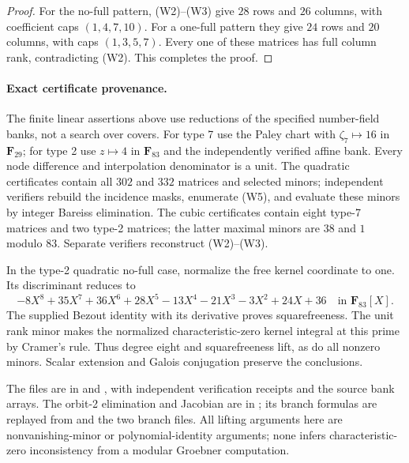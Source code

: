 \begin{proof}
For the no-full pattern, (W2)--(W3) give $28$ rows and $26$ columns,
with coefficient caps $(1,4,7,10)$.  For a one-full pattern they give
$24$ rows and $20$ columns, with caps $(1,3,5,7)$.
Every one of these matrices has full column rank, contradicting (W2).
This completes the proof.
\end{proof}

\paragraph{Exact certificate provenance.}
The finite linear assertions above use reductions of the specified
number-field banks, not a search over covers.  For type 7 use the
Paley chart with $\zeta_7\mapsto16$ in $\mathbf F_{29}$; for type 2
use $z\mapsto4$ in $\mathbf F_{83}$ and the independently verified
affine bank.  Every node difference and interpolation denominator is
a unit.  The quadratic certificates contain all $302$ and $332$
matrices and selected minors; independent verifiers rebuild the
incidence masks, enumerate (W5), and evaluate these minors by integer
Bareiss elimination.  The cubic certificates contain eight type-7
matrices and two type-2 matrices; the latter maximal minors are
$38$ and $1$ modulo $83$.  Separate verifiers reconstruct (W2)--(W3).

In the type-2 quadratic no-full case, normalize the free kernel
coordinate to one.  Its discriminant reduces to
\[
 -8X^8+35X^7+36X^6+28X^5-13X^4-21X^3-3X^2+24X+36
 \quad\text{in }\mathbf F_{83}[X].
\]
The supplied Bezout identity with its derivative proves squarefreeness.
The unit rank minor makes the normalized characteristic-zero kernel
integral at this prime by Cramer's rule.  Thus degree eight and
squarefreeness lift, as do all nonzero minors.  Scalar extension and
Galois conjugation preserve the conclusions.

The files are in  and
, with independent verification
receipts and the source bank arrays.  The orbit-2 elimination and
Jacobian are in ;
its branch formulas are replayed from
 and the two branch files.
All lifting arguments here are nonvanishing-minor or polynomial-identity
arguments; none infers characteristic-zero inconsistency from a
modular Groebner computation.
